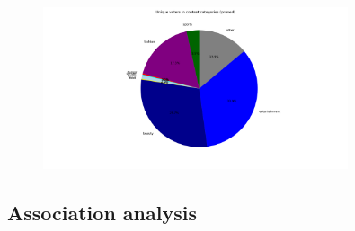 \begin{figure}[h] 
    \begin{center}
        \includegraphics[width=0.8\textwidth]{Images/user_engagement_in_categories_pie-pruned.png}
        \caption{}
        \label{}
    \end{center}
\end{figure}


\subsection{Association analysis}
